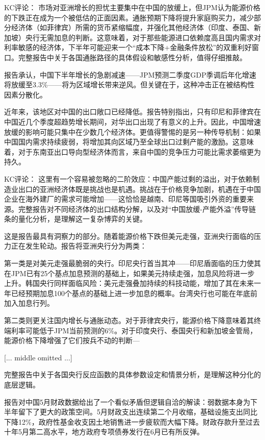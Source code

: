 \documentclass[11pt]{ctexart}
\begin{document}
KC评论： 市场对亚洲增长的担忧主要集中在中国的放缓上，但JPM认为能源价格的下跌正在成为一个被低估的正面因素。通胀预期下降将提升家庭购买力，减少部分经济体（如菲律宾）所需的货币紧缩幅度，并强化其他经济体（印度、泰国、新加坡）央行无需加息的判断。这意味着，对于那些能源进口依赖度高且国内需求对利率敏感的经济体，下半年可能迎来一个“成本下降+金融条件放松”的双重利好窗口。完整报告中关于各国通胀路径的具体假设和敏感性分析，值得仔细推敲。

报告承认，中国下半年增长的急剧减速——JPM预测二季度GDP季调后年化增速将放缓至3.3\%——将为区域增长带来逆风。但关键在于，这种冲击正在被结构性因素分散化。

近年来，该地区对中国的出口敞口已经降低。报告特别指出，只有印尼和菲律宾在中国近几个季度超趋势增长期间，对华出口出现了有意义的上升。因此，中国增速放缓的影响可能只集中在少数几个经济体。更值得警惕的是另一种传导机制：如果中国国内需求持续疲弱，将增加其向区域乃至全球出口过剩产能的激励。这意味着，对于东南亚出口导向型经济体而言，来自中国的竞争压力可能比需求萎缩更为持久。

KC评论： 这里有一个容易被忽略的二阶效应：中国产能过剩的溢出，对于依赖制造业出口的亚洲经济体既是挑战也是机遇。挑战在于价格竞争加剧，机遇在于中国企业在海外建厂的需求可能增加——这恰恰是越南、印尼等国吸引外资的重要来源。完整报告对不同经济体的出口结构分解，以及对“中国放缓-产能外溢”传导链条的量化分析，是理解这一复杂博弈的关键。

这是报告最具有洞察力的部分。随着能源价格下跌但美元走强，亚洲央行面临的压力正在发生轮动。报告将亚洲央行分为两类：

第一类是对美元走强最脆弱的央行。印尼央行首当其冲——印尼盾面临的压力使其在JPM已有25个基点加息预测的基础上，如果美元持续走强，加息风险将进一步上升。韩国央行同样面临风险：美元走强叠加持续的科技动能，增加了其在未来一年已经预期加息100个基点的基础上进一步加息的概率。台湾央行也可能在年底前加入加息行列。

第二类则更关注国内增长与通胀动态。对于菲律宾央行，能源价格下降意味着其终端利率可能低于JPM当前预测的6\%。对于印度央行、泰国央行和新加坡金管局，能源价格下降增强了它们按兵不动的判断—

[... middle omitted ...]

完整报告中关于各国央行反应函数的具体参数设定和情景分析，是理解这种分化的底层逻辑。

报告对中国5月财政数据给出了一个看似矛盾但逻辑自洽的解读：弱数据本身为下半年留下了更大的政策空间。5月财政支出连续第二个月收缩，基础设施支出同比下降12\%，政府性基金收支因土地销售进一步疲软而大幅下降。财政存款升至过去十年5月第二高水平，地方政府专项债券发行在6月已有所反弹。
\end{document}
